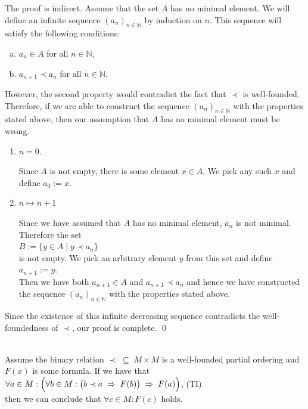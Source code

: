 \proof
The proof is indirect.  Assume that the set $A$ has no minimal element.  We will define an infinite sequence
$(a_n)_{n\in\mathbb{N}}$ by induction on $n$.  This sequence will satisfy the following conditions:
\begin{enumerate}[(a)]
\item $a_n \in A$ \quad for all $n \in \mathbb{N}$,
\item $a_{n+1} \prec a_n$ \quad for all $n \in \mathbb{N}$.
\end{enumerate}
However, the second property would contradict the fact that $\prec$ is well-founded.  Therefore, if we are able
to construct the sequence $(a_n)_{n\in\mathbb{N}}$ with the properties stated above, then our assumption that
$A$ has no minimal element must be wrong.
\begin{enumerate}
\item[B.C.:] $n=0$.

             Since $A$ is not empty, there is some element $x\in A$.  We pick any such $x$ and define $a_0:=x$.
\item[I.S.:] $n \mapsto n+1$

             Since we have assumed that $A$ has no minimal element, $a_n$ is not minimal.  Therefore the set
             \\[0.2cm]
             \hspace*{1.3cm}
             $B := \{ y \in A \mid y \prec a_n \}$ 
             \\[0.2cm]
             is not empty.  We pick an arbitrary element $y$ from this set and define
             \\[0.2cm]
             \hspace*{1.3cm}
             $a_{n+1} := y$.
             \\[0.2cm]
             Then we have both $a_{n+1} \in A$ and $a_{n+1} \prec a_n$ and hence we have constructed
             the sequence $(a_{n})_{n\in\mathbb{N}}$ with the properties stated above.
\end{enumerate}
Since the existence of this infinite decreasing sequence contradicts the well-foundedness of $\prec$, our proof
is complete. \qed

\begin{Theorem}
  \hspace*{\fill} \\
  Assume the binary relation $\prec \;\subseteq\; M \times M$ is a well-founded partial ordering and $F(x)$ is some formula.
  If we have that
  \\[0.2cm]
  \hspace*{1.3cm}
  $\forall a \in M: \Bigl(\forall b \in M: \bigl( b \prec a \;\Rightarrow\; F(b)\bigr) \;\Rightarrow\; F(a)\Bigr)$, \hspace*{\fill} (TI)
  \\[0.2cm]
  then we can conclude that $\forall c \in M: F(c)$ holds.
\end{Theorem}

